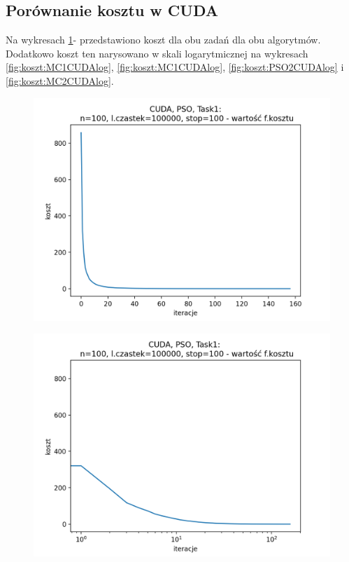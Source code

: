 \documentclass[11pt, a4paper, oneside]{article}
\begin{document}
\subsection{Porównanie kosztu w CUDA} \label{sec:CUDA2}

Na wykresach \ref{fig:koszt:PSO1CUDAlog}-\label{fig:koszt:MC2CUDAlog} przedstawiono koszt dla obu zadań dla obu algorytmów. Dodatkowo koszt ten narysowano w skali logarytmicznej na wykresach \ref{fig:koszt:MC1CUDAlog}, \ref{fig:koszt:MC1CUDAlog}, \ref{fig:koszt:PSO2CUDAlog} i \ref{fig:koszt:MC2CUDAlog}.

\begin{figure}[H]
\centering
\begin{minipage}[b]{\dimexpr.5\textwidth-1em}
  \centering
  \includegraphics[width=1\linewidth]{grafiki/CUDA/CUDA_PSO_Task1_koszt_linear.png}
  \label{fig:koszt:PSO1CUDA}
\end{minipage} \hfill
\begin{minipage}[b]{\dimexpr.5\textwidth-1em}
  \centering
  \includegraphics[width=1\linewidth]{grafiki/CUDA/CUDA_PSO_Task1_koszt_log.png}
  \label{fig:koszt:PSO1CUDAlog}
\end{minipage}
\end{figure}
\end{document}
